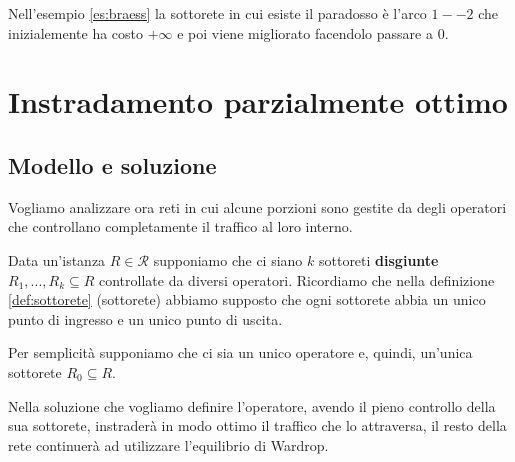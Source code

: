 \documentclass[a4paper]{article}
\theoremstyle{plain}
\theoremstyle{definition}
\theoremstyle{remark}
\begin{document}
Nell'esempio \ref{es:braess} la sottorete in cui esiste il paradosso è
l'arco $1 -- 2$ che inizialemente ha costo $+\infty$ e poi viene
migliorato facendolo passare a $0$.

\section{Instradamento parzialmente ottimo}

\subsection{Modello e soluzione}
\label{sec:por-modello}

Vogliamo analizzare ora reti in cui alcune porzioni sono gestite da
degli operatori che controllano completamente il traffico al loro
interno.

Data un'istanza $R\in \mathcal{R}$ supponiamo che ci siano $k$
sottoreti \textbf{disgiunte} $R_1,...,R_k \subseteq R$ controllate da
diversi operatori. Ricordiamo che nella definizione
\ref{def:sottorete} (sottorete) abbiamo supposto che ogni sottorete
abbia un unico punto di ingresso e un unico punto di uscita.

Per semplicità supponiamo che ci sia un unico operatore e, quindi,
un'unica sottorete $R_0 \subseteq R$.

Nella soluzione che vogliamo definire l'operatore, avendo il pieno
controllo della sua sottorete, instraderà in modo ottimo il traffico
che lo attraversa, il resto della rete continuerà ad utilizzare
l'equilibrio di Wardrop.
\end{document}

